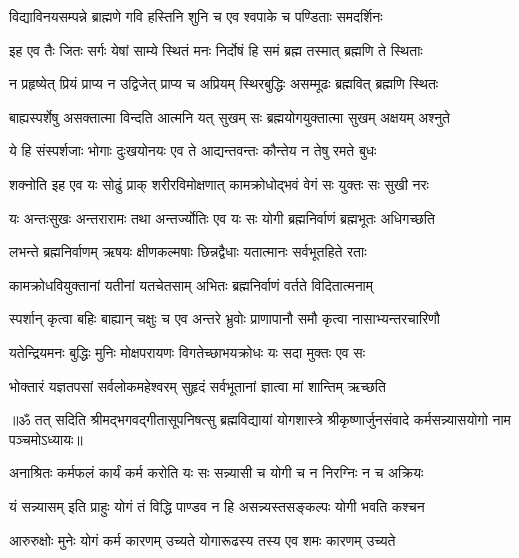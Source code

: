\twolineshloka
{विद्याविनयसम्पन्ने ब्राह्मणे गवि हस्तिनि}
{शुनि च एव श्वपाके च पण्डिताः समदर्शिनः}%

\twolineshloka
{इह एव तैः जितः सर्गः येषां साम्ये स्थितं मनः}
{निर्दोषं हि समं ब्रह्म तस्मात् ब्रह्मणि ते स्थिताः}%

\twolineshloka
{न प्रहृष्येत् प्रियं प्राप्य न उद्विजेत् प्राप्य च अप्रियम्}
{स्थिरबुद्धिः असम्मूढः ब्रह्मवित् ब्रह्मणि स्थितः}%

\twolineshloka
{बाह्यस्पर्शेषु असक्तात्मा विन्दति आत्मनि यत् सुखम्}
{सः ब्रह्मयोगयुक्तात्मा सुखम् अक्षयम् अश्नुते}%

\twolineshloka
{ये हि संस्पर्शजाः भोगाः दुःखयोनयः एव ते}
{आद्यन्तवन्तः कौन्तेय न तेषु रमते बुधः}%

\twolineshloka
{शक्नोति इह एव यः सोढुं प्राक् शरीरविमोक्षणात्}
{कामक्रोधोद्भवं वेगं सः युक्तः सः सुखी नरः}%

\twolineshloka
{यः अन्तःसुखः अन्तरारामः तथा अन्तर्ज्योतिः एव यः}
{सः योगी ब्रह्मनिर्वाणं ब्रह्मभूतः अधिगच्छति}%

\twolineshloka
{लभन्ते ब्रह्मनिर्वाणम् ऋषयः क्षीणकल्मषाः}
{छिन्नद्वैधाः यतात्मानः सर्वभूतहिते रताः}%

\twolineshloka
{कामक्रोधवियुक्तानां यतीनां यतचेतसाम्}
{अभितः ब्रह्मनिर्वाणं वर्तते विदितात्मनाम्}%

\twolineshloka
{स्पर्शान् कृत्वा बहिः बाह्यान् चक्षुः च एव अन्तरे भ्रुवोः}
{प्राणापानौ समौ कृत्वा नासाभ्यन्तरचारिणौ}%

\twolineshloka
{यतेन्द्रियमनः बुद्धिः मुनिः मोक्षपरायणः}
{विगतेच्छाभयक्रोधः यः सदा मुक्तः एव सः}%

\twolineshloka
{भोक्तारं यज्ञतपसां सर्वलोकमहेश्वरम्}
{सुहृदं सर्वभूतानां ज्ञात्वा मां शान्तिम् ऋच्छति}%

{॥ॐ तत् सदिति श्रीमद्भगवद्गीतासूपनिषत्सु ब्रह्मविद्यायां योगशास्त्रे श्रीकृष्णार्जुनसंवादे कर्मसन्न्यासयोगो नाम पञ्चमोऽध्यायः॥}



\twolineshloka
{अनाश्रितः कर्मफलं कार्यं कर्म करोति यः}
{सः सन्न्यासी च योगी च न निरग्निः न च अक्रियः}%

\twolineshloka
{यं सन्न्यासम् इति प्राहुः योगं तं विद्धि पाण्डव}
{न हि असन्न्यस्तसङ्कल्पः योगी भवति कश्चन}%

\twolineshloka
{आरुरुक्षोः मुनेः योगं कर्म कारणम् उच्यते}
{योगारूढस्य तस्य एव शमः कारणम् उच्यते}%

